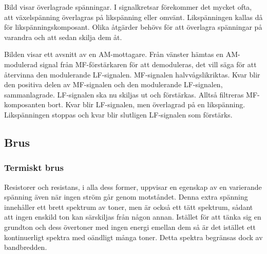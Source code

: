 Bild  visar överlagrade spänningar.
I signalkretsar förekommer det mycket ofta, att växelspänning överlagras på
likspänning eller omvänt.
Likspänningen kallas då för likspänningskomposant.
Olika åtgärder behövs för att överlagra spänningar på varandra och att sedan
skilja dem åt.

Bilden visar ett avsnitt av en AM-mottagare.
Från vänster hämtas en AM-modulerad signal från MF-förstärkaren för att
demoduleras, det vill säga för att återvinna den modulerande LF-signalen.
MF-signalen halvvågslikriktas.
Kvar blir den positiva delen av MF-signalen och den modulerande LF-signalen,
sammanlagrade.
LF-signalen ska nu skiljas ut och förstärkas.
Alltså filtreras MF-komposanten bort.
Kvar blir LF-signalen, men överlagrad på en likspänning.
Likspänningen stoppas och kvar blir slutligen LF-signalen som förstärks.

\subsection{Brus}
\label{termisktbrus}

\subsubsection{Termiskt brus}

Resistorer och resistans, i alla dess former, uppvisar en egenskap av
en varierande spänning även när ingen ström går genom motståndet.
Denna extra spänning innehåller ett brett spektrum av toner, men är också ett
tätt spektrum, sådant att ingen enskild ton kan särskiljas från någon annan.
Istället för att tänka sig en grundton och dess övertoner med ingen energi
emellan dem så är det istället ett kontinuerligt spektra med oändligt många
toner.
Detta spektra begränsas dock av bandbredden.




